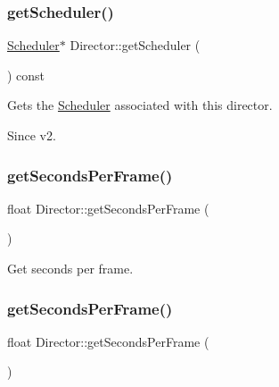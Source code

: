 \subsubsection{\texorpdfstring{get\+Scheduler()}{getScheduler()}\hspace{0.1cm}{\footnotesize\ttfamily [2/2]}}
{\footnotesize\ttfamily \hyperlink{classScheduler}{Scheduler}$\ast$ Director\+::get\+Scheduler (\begin{DoxyParamCaption}{ }\end{DoxyParamCaption}) const\hspace{0.3cm}{\ttfamily [inline]}}

Gets the \hyperlink{classScheduler}{Scheduler} associated with this director. \begin{DoxySince}{Since}
v2. 
\end{DoxySince}
\mbox{\label{classDirector_a38da2885fd753374ee9e2cd545b9ae4c}} 
\subsubsection{\texorpdfstring{get\+Seconds\+Per\+Frame()}{getSecondsPerFrame()}\hspace{0.1cm}{\footnotesize\ttfamily [1/2]}}
{\footnotesize\ttfamily float Director\+::get\+Seconds\+Per\+Frame (\begin{DoxyParamCaption}{ }\end{DoxyParamCaption})\hspace{0.3cm}{\ttfamily [inline]}}

Get seconds per frame. \mbox{\label{classDirector_a38da2885fd753374ee9e2cd545b9ae4c}} 
\subsubsection{\texorpdfstring{get\+Seconds\+Per\+Frame()}{getSecondsPerFrame()}\hspace{0.1cm}{\footnotesize\ttfamily [2/2]}}
{\footnotesize\ttfamily float Director\+::get\+Seconds\+Per\+Frame (\begin{DoxyParamCaption}{ }\end{DoxyParamCaption})\hspace{0.3cm}{\ttfamily [inline]}}

